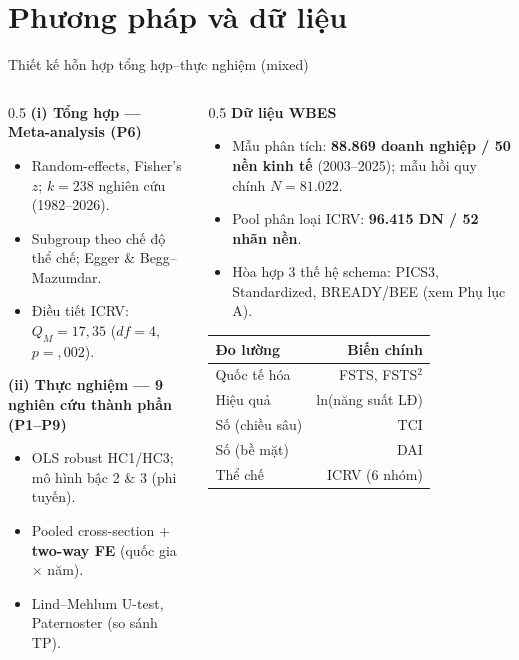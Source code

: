 \documentclass[aspectratio=169,11pt]{beamer}
\newcommand{\hl}[1]{\textcolor{accent2}{\textbf{#1}}}
\newcommand{\kw}[1]{\textcolor{accent}{\textbf{#1}}}
\begin{document}
\section{Phương pháp và dữ liệu}
\begin{frame}{Thiết kế hỗn hợp tổng hợp--thực nghiệm (mixed)}
  \begin{columns}[T]
    \begin{column}{0.5\textwidth}
      \textbf{(i) Tổng hợp --- Meta-analysis (P6)}
      \begin{itemize}\small
        \item Random-effects, Fisher's $z$; $k = 238$ nghiên cứu (1982--2026).
        \item Subgroup theo chế độ thể chế; Egger \& Begg--Mazumdar.
        \item Điều tiết ICRV: \hl{$Q_M = 17{,}35$} ($df=4$, $p={,}002$).
      \end{itemize}
      \vspace{0.3em}
      \textbf{(ii) Thực nghiệm --- 9 nghiên cứu thành phần (P1--P9)}
      \begin{itemize}\small
        \item OLS robust HC1/HC3; mô hình bậc 2 \& 3 (phi tuyến).
        \item Pooled cross-section + \kw{two-way FE} (quốc gia $\times$ năm).
        \item Lind--Mehlum U-test, Paternoster (so sánh TP).
      \end{itemize}
    \end{column}
    \begin{column}{0.5\textwidth}
      \textbf{Dữ liệu WBES}
      \begin{itemize}\small
        \item Mẫu phân tích: \hl{88.869 doanh nghiệp / 50 nền kinh tế} (2003--2025); mẫu hồi quy chính $N=81.022$.
        \item Pool phân loại ICRV: \hl{96.415 DN / 52 nhãn nền}.
        \item Hòa hợp 3 thế hệ schema: PICS3, Standardized, BREADY/BEE (xem Phụ lục A).
      \end{itemize}
      \vspace{0.3em}
      \footnotesize
      \begin{tabular}{@{}lr@{}}
        \toprule
        Đo lường & Biến chính \\
        \midrule
        Quốc tế hóa & FSTS, FSTS$^2$ \\
        Hiệu quả & ln(năng suất LĐ) \\
        Số (chiều sâu) & TCI \\
        Số (bề mặt) & DAI \\
        Thể chế & ICRV (6 nhóm) \\
        \bottomrule
      \end{tabular}
    \end{column}
  \end{columns}
\end{frame}
\end{document}
